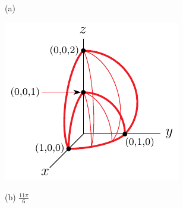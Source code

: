 %

\begin{answer}
(a)
\begin{center}
     \includegraphics{fig/OE06A_8b.pdf}
\end{center}

(b) $\frac{11\pi}{6}$
\end{answer}

